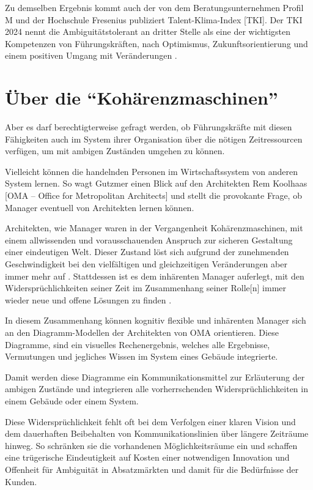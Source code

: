 \documentclass[
  ngerman,
  letterpaper,
  DIV=11]{scrartcl}
\begin{document}
Zu demselben Ergebnis kommt auch der von dem Beratungsunternehmen Profil
M und der Hochschule Fresenius publiziert Talent-Klima-Index {[}TKI{]}.
Der TKI 2024 nennt die Ambiguitätstolerant an dritter Stelle als eine
der wichtigsten Kompetenzen von Führungskräften, nach Optimismus,
Zukunftsorientierung und einem positiven Umgang mit Veränderungen
\autocite{stulle2024}.

\section{Über die
``Kohärenzmaschinen''}\label{uxfcber-die-kohuxe4renzmaschinen}

Aber es darf berechtigterweise gefragt werden, ob Führungskräfte mit
diesen Fähigkeiten auch im System ihrer Organisation über die nötigen
Zeitressourcen verfügen, um mit ambigen Zuständen umgehen zu können.

Vielleicht können die handelnden Personen im Wirtschaftssystem von
anderen System lernen. So wagt Gutzmer einen Blick auf den Architekten
Rem Koolhaas {[}OMA -- Office for Metropolitan Architects{]} und stellt
die provokante Frage, ob Manager eventuell von Architekten lernen
können.

Architekten, wie Manager waren in der Vergangenheit Kohärenzmaschinen,
mit einem allwissenden und vorausschauenden Anspruch zur sicheren
Gestaltung einer eindeutigen Welt. Dieser Zustand löst sich aufgrund der
zunehmenden Geschwindigkeit bei den vielfältigen und gleichzeitigen
Veränderungen aber immer mehr auf \autocite[11]{roth2019}. Stattdessen
ist es dem inhärenten Manager auferlegt, mit den Widersprüchlichkeiten
seiner Zeit im Zusammenhang seiner Rolle{[}n{]} immer wieder neue und
offene Lösungen zu finden \autocite[102]{gutzmer2020}.

In diesem Zusammenhang können kognitiv flexible und inhärenten Manager
sich an den Diagramm-Modellen der Architekten von OMA orientieren. Diese
Diagramme, sind ein visuelles Rechenergebnis, welches alle Ergebnisse,
Vermutungen und jegliches Wissen im System eines Gebäude integrierte.

Damit werden diese Diagramme ein Kommunikationsmittel zur Erläuterung
der ambigen Zustände und integrieren alle vorherrschenden
Widersprüchlichkeiten in einem Gebäude oder einem System.

Diese Widersprüchlichkeit fehlt oft bei dem Verfolgen einer klaren
Vision und dem dauerhaften Beibehalten von Kommunikationslinien über
längere Zeiträume hinweg. So schränken sie die vorhandenen
Möglichkeitsräume ein und schaffen eine trügerische Eindeutigkeit auf
Kosten einer notwendigen Innovation und Offenheit für Ambiguität in
Absatzmärkten und damit für die Bedürfnisse der Kunden.
\end{document}
